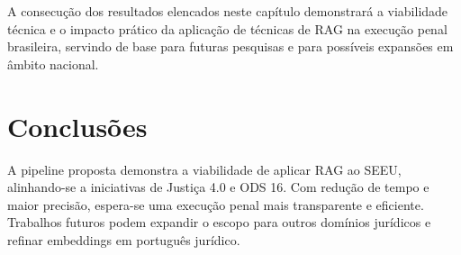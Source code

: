 A consecução dos resultados elencados neste capítulo demonstrará a viabilidade técnica e o impacto prático da aplicação de técnicas de RAG na execução penal brasileira, servindo de base para futuras pesquisas e para possíveis expansões em âmbito nacional.


\chapter{Conclusões}
\label{chap:conclusoes}

A pipeline proposta demonstra a viabilidade de aplicar RAG ao SEEU, alinhando-se a iniciativas de Justiça 4.0 e ODS 16. Com redução de tempo e maior precisão, espera-se uma execução penal mais transparente e eficiente. Trabalhos futuros podem expandir o escopo para outros domínios jurídicos e refinar embeddings em português jurídico.